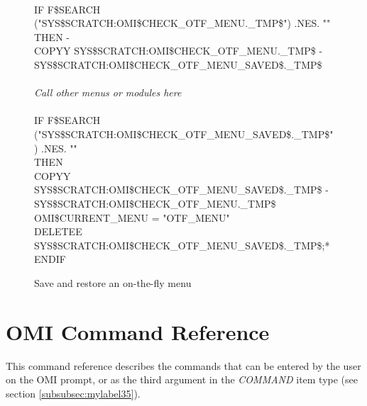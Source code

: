 \documentclass[a4paper]{book}
\renewcommand{\indent}{\hspace*{5mm}}
\begin{document}
\begin{figure}[ht]
\begin{minipage}[t]{\textwidth}
\hrulefill \\
\begin{small}
\begin{ttfamily}
\indent{\$} IF F{\$}SEARCH ("SYS{\$}SCRATCH:OMI{\$}CHECK{\_}OTF{\_}MENU.{\_}TMP{\$}") .NES. "" THEN - \\
\indent\indent {\$} COPYY SYS{\$}SCRATCH:OMI{\$}CHECK{\_}OTF{\_}MENU.{\_}TMP{\$} - \\
\indent\indent SYS{\$}SCRATCH:OMI{\$}CHECK{\_}OTF{\_}MENU{\_}SAVED{\$}.{\_}TMP{\$} \\
\vspace{2mm}\\
\textsl{Call other menus or modules here} \\
\vspace{2mm}\\
\indent{\$} IF F{\$}SEARCH ("SYS{\$}SCRATCH:OMI{\$}CHECK{\_}OTF{\_}MENU{\_}SAVED{\$}.{\_}TMP{\$}") .NES. "" \\
\indent{\$} \indent THEN \\
\indent{\$} \indent\indent COPYY SYS{\$}SCRATCH:OMI{\$}CHECK{\_}OTF{\_}MENU{\_}SAVED{\$}.{\_}TMP{\$} - \\
\indent\indent\indent\indent SYS{\$}SCRATCH:OMI{\$}CHECK{\_}OTF{\_}MENU.{\_}TMP{\$} \\
\indent{\$} \indent\indent OMI{\$}CURRENT{\_}MENU = "OTF{\_}MENU" \\
\indent{\$} \indent\indent DELETEE SYS{\$}SCRATCH:OMI{\$}CHECK{\_}OTF{\_}MENU{\_}SAVED{\$}.{\_}TMP{\$};* \\
\indent{\$} ENDIF 
\end{ttfamily}
\end{small}
\caption{Save and restore an on-the-fly menu}\label{fig:otfsavres}
\hrulefill
\end{minipage}
\end{figure}


\chapter{OMI Command Reference}
\label{sec:mylabel1}

This command reference describes the commands that can be entered by the 
user on the OMI prompt, or as the third argument in the \textsl{COMMAND} item 
type (see section \ref{subsubsec:mylabel35}).
\end{document}
